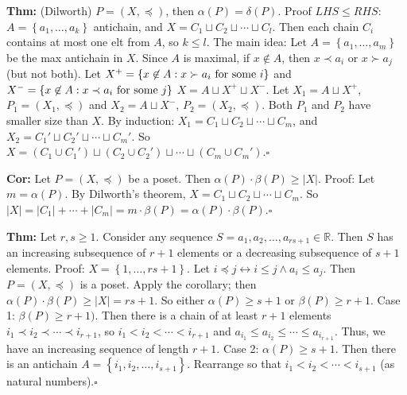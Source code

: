 \documentclass[10pt,letterpaper]{article}
\newcommand{\n}{\hfill\break}
\newcommand{\thm}[1]{\par\noindent\settowidth{\hangindent}{\textbf{Thm: }}\textbf{Thm: }#1\n}
\newcommand{\cor}[1]{\par\noindent\settowidth{\hangindent}{\textbf{Cor: }}\textbf{Cor: }#1\n}
\newcommand{\proven}{\;$\square$\n}
\newcommand{\ptxt}[1]{\textrm{\textnormal{#1}}}
\newcommand{\card}[1]{\left|#1\right|}
\newcommand{\set}[1]{\left\{#1\right\}}
\newcommand{\reals}{\mathbb{R}}
\newcommand{\R}{\reals}
\begin{document}
\thm{(Dilworth) $P=(X,\preceq)$, then $\alpha(P)=\delta(P)$.\n
Proof $LHS\le{}RHS$: $A=\set{a_{1},\ldots,a_{k}}$ antichain, and $X=C_{1}\sqcup{}C_{2}\sqcup\cdots\sqcup{}C_{l}$. Then each chain $C_{i}$ contains at most one elt from $A$, so $k\le{}l$.\n
The main idea: Let $A=\set{a_{1},\ldots,a_{m}}$ be the max antichain in $X$. Since $A$ is maximal, if $x\not\in{}A$, then $x\prec{}a_{i}$ or $x\succ{}a_{j}$ (but not both). Let $X^{+}=\set{x\not\in{}A:x\succ{}a_{i}\ptxt{ for some }i}$ and\n
$X^{-}=\set{x\not\in{}A:x\prec{}a_{i}\ptxt{ for some }j}$\n
$X=A\sqcup{}X^{+}\sqcup{}X^{-}$. Let $X_{1}=A\sqcup{}X^{+}$, $P_{1}=(X_{1},\preceq)$ and $X_{2}=A\sqcup{}X^{-}$, $P_{2}=(X_{2},\preceq)$. Both $P_{1}$ and $P_{2}$ have smaller size than $X$. By induction: $X_{1}=C_{1}\sqcup{}C_{2}\sqcup\cdots\sqcup{}C_{m}$, and $X_{2}=C_{1}'\sqcup{}C_{2}'\sqcup\cdots\sqcup{}C_{m}'$. So $X=(C_{1}\cup{}C_{1}')\sqcup(C_{2}\cup{}C_{2}')\sqcup\cdots\sqcup(C_{m}\cup{}C_{m}')$.\proven}

\cor{Let $P=(X,\preceq)$ be a poset. Then $\alpha(P)\cdot\beta(P)\ge\card{X}$.\n
Proof: Let $m=\alpha(P)$. By Dilworth's theorem, $X=C_{1}\sqcup{}C_{2}\sqcup\cdots\sqcup{}C_{m}$.\n
So $\card{X}=\card{C_{1}}+\cdots+\card{C_{m}}=m\cdot\beta(P)=\alpha(P)\cdot\beta(P)$.\proven}

\thm{Let $r,s\ge{}1$. Consider any sequence $S=a_{1},a_{2},\ldots,a_{rs+1}\in\R$. Then $S$ has an increasing subsequence of $r+1$ elements or a decreasing subsequence of $s+1$ elements.\n
Proof: $X=\set{1,\ldots,rs+1}$. Let $i\preceq{}j\leftrightarrow{}i\le{}j\land{}a_{i}\le{}a_{j}$. Then $P=(X,\preceq)$ is a poset. Apply the corollary; then $\alpha(P)\cdot\beta(P)\ge\card{X}=rs+1$. So either $\alpha(P)\ge{}s+1$ or $\beta(P)\ge{}r+1$.\n
Case 1: $\beta(P)\ge{}r+1)$. Then there is a chain of at least $r+1$ elements $i_{1}\prec{}i_{2}\prec\cdots\prec{}i_{r+1}$, so $i_{1}<i_{2}<\cdots<i_{r+1}$ and $a_{i_{1}}\le{}a_{i_{2}}\le\cdots\le{}a_{i_{r+1}}$. Thus, we have an increasing sequence of length $r+1$.\n
Case 2: $\alpha(P)\ge{}s+1$. Then there is an antichain $A=\set{i_{1},i_{2},\ldots,i_{s+1}}$. Rearrange so that $i_{1}<i_{2}<\cdots<i_{s+1}$ (as natural numbers).\proven}
\end{document}
